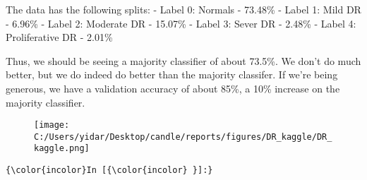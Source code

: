\documentclass[11pt]{article}
\makeatletter
\def\maxwidth{\ifdim\Gin@nat@width>\linewidth\linewidth
    \else\Gin@nat@width\fi}
\let\Oldincludegraphics\includegraphics
\renewcommand{\includegraphics}[1]{\Oldincludegraphics[width=.8\maxwidth]{#1}}
\makeatother
\begin{document}
The data has the following splits: - Label 0: Normals - 73.48\% - Label
1: Mild DR - 6.96\% - Label 2: Moderate DR - 15.07\% - Label 3: Sever DR
- 2.48\% - Label 4: Proliferative DR - 2.01\%

Thus, we should be seeing a majority classifier of about 73.5\%. We
don't do much better, but we do indeed do better than the majority
classifer. If we're being generous, we have a validation accuracy of
about 85\%, a 10\% increase on the majority classifier.

\begin{figure}
\centering
\texttt{[image: C:/Users/yidar/Desktop/candle/reports/figures/DR\_kaggle/DR\_kaggle.png]}
\caption{}
\end{figure}

    \begin{Verbatim}[commandchars=\\\{\}]
{\color{incolor}In [{\color{incolor} }]:} 
\end{Verbatim}


    
    
    
    
\end{document}
